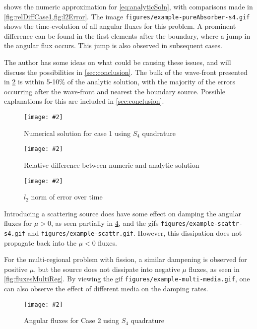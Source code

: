 \documentclass{article}
\newcommand{\myfig}[2]{\texttt{[image: \#2]}}
\begin{document}
 shows the numeric approximation for \cref{eq:analyticSoln}, with comparisons 
made in \cref{fig:relDiffCase1,fig:l2Error}.
The image \texttt{figures/example-pureAbsorber-s4.gif} shows the time-evolution of 
all angular fluxes for this problem.
A prominent difference can be found in the first elements after the boundary, where a jump
in the angular flux occurs. 
This jump is also observed in subsequent cases.

The author has some ideas on what could be causing these issues, and will discuss the 
possibilities in \cref{sec:conclusion}.
The bulk of the wave-front presented in \cref{fig:relDiffCase1} is within 5-10\% of the 
analytic solution, with the majority of the errors occurring after the wave-front
and nearest the boundary source. Possible explanations for this are included in \cref{sec:conclusion}.

\begin{figure}
    \centering
    \myfig{3.5in}{../figures/femSoln-absorber-s4-m3.png}
    \caption{Numerical solution for case 1 using $S_4$ quadrature}
    \label{fig:femCase1}
\end{figure}

\begin{figure}
    \centering
    \myfig{3.5in}{../figures/mu3-relDiff-mesh.png}
    \caption{Relative difference between numeric and analytic solution}
    \label{fig:relDiffCase1}
\end{figure}

\begin{figure}
    \centering
    \myfig{3.5in}{../figures/error-time-s4.png}
    \caption{$l_2$ norm of error over time}
    \label{fig:l2Error}
\end{figure}

Introducing a scattering source does have some effect on damping
the angular fluxes for $\mu>0$, as seen partially in \cref{fig:fluxesScatterS4}, and the
gifs \texttt{figures/example-scattr-s4.gif} and \texttt{figures/example-scattr.gif}.
However, this dissipation does not propagate back into the $\mu<0$ fluxes.

For the multi-regional problem with fission, a similar dampening is observed for positive $\mu$, 
but the source does not dissipate into negative $\mu$ fluxes, as seen in \cref{fig:fluxesMultiReg}.
By viewing the gif \texttt{figures/example-multi-media.gif}, one can also observe the
effect of different media on the damping rates.

\begin{figure}
    \centering
    \myfig{3.5in}{../figures/example-scattr-s4.png}
    \caption{Angular fluxes for Case 2 using $S_4$ quadrature}
    \label{fig:fluxesScatterS4}
\end{figure}
\end{document}
